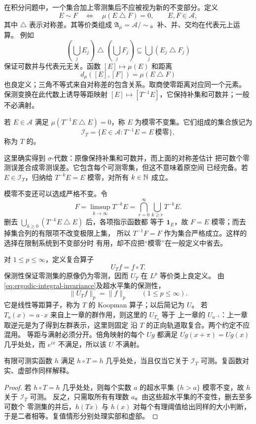 在积分问题中，一个集合加上零测集后不应被视为新的不变部分。定义
\[
 E\sim F\quad\Longleftrightarrow\quad\mu(E\mathbin\triangle F)=0,
 \qquad E,F\in\mathcal A,
\]
其中 $\triangle$ 表示对称差。其等价类组成
$\mathfrak A_\mu=\mathcal A/{\sim}$。补、并、交均在代表元上运算。
例如
\[
 \left(\bigcup_jE_j\right)\mathbin\triangle
 \left(\bigcup_jF_j\right)
 \subseteq\bigcup_j(E_j\mathbin\triangle F_j)
\]
保证可数并与代表元无关。函数 $[E]\mapsto\mu(E)$ 和距离
\[
 d_\mu([E],[F])=\mu(E\mathbin\triangle F)
\]
也良定义；三角不等式来自对称差的包含关系。取商使零距离对应同一个元素。
保测变换在此代数上诱导等距映射
$[E]\mapsto[T^{-1}E]$，它保持补集和可数并；一般不必满射。

\begin{definition}\label{def:ergodic-invariant-sigma-algebra}
若 $E\in\mathcal A$ 满足 $\mu(T^{-1}E\mathbin\triangle E)=0$，称 $E$
为模零不变集。它们组成的集合族记为
\[
 \mathcal I_T=\{E\in\mathcal A:T^{-1}E=E\ \text{模零}\},
\]
称为 $T$ 的。
\end{definition}

这里确实得到 $\sigma$-代数：原像保持补集和可数并，而上面的对称差估计
把可数个零测误差合成零测误差。它包含每个可测零集，但这不意味着原空间
已经完备。若 $E\in\mathcal I_T$，归纳给
$T^{-k}E=E$ 模零，对所有 $k\in\mathbb{N}$ 成立。

模零不变还可以选成严格不变。令
\[
 F=\limsup_{k\to\infty}T^{-k}E
   =\bigcap_{r=0}^\infty\bigcup_{k\ge r}T^{-k}E.
\]
删去 $\bigcup_{k\ge0}(T^{-k}E\mathbin\triangle E)$ 后，各项指示函数都
等于 $\mathbf1_E$，故 $F=E$ 模零；而去掉集合列的有限项不改变极限上集，
所以 $T^{-1}F=F$ 作为集合严格成立。这样的选择在限制系统到不变部分时
有用，却不应把“模零”在一般定义中省去。

对 $1\le p\le\infty$，定义复合算子
\[
 U_Tf=f\circ T.
\]
保测性保证零测集的原像仍为零测，因而 $U_T$ 在 $L^p$ 等价类上良定义。
由\eqref{eq:ergodic-integral-invariance}及超水平集的保测性，
\begin{equation}\label{eq:ergodic-koopman-isometry}
 \|U_Tf\|_p=\|f\|_p\qquad(1\le p\le\infty).
\end{equation}
它是线性等距算子，称为 $T$ 的 Koopman 算子；以后简记为 $U$。
若 $T_a(x)=a\cdot x$ 来自上一章的群作用，则这里的 $U_{T_a}$ 等于
上一章的 $U_{a^{-1}}$：上一章取逆元是为了得到左群表示，这里则固定
沿 $T$ 的正向轨道取复合。两个约定不应混用。
等距与满射必须分开。倍角映射的每个 $Ug$ 都满足
$Ug(x+\pi)=Ug(x)$ 几乎处处，而 $e^{ix}$ 不满足，所以该 $U$ 不满射。

\begin{proposition}\label{prop:ergodic-invariant-functions}
有限可测实函数 $h$ 满足 $h\circ T=h$ 几乎处处，当且仅当它关于
$\mathcal I_T$ 可测。复函数对实、虚部作同样解释。
\end{proposition}
\begin{proof}
若 $h\circ T=h$ 几乎处处，则每个实数 $a$ 的超水平集
$\{h>a\}$ 模零不变，故 $h$ 关于 $\mathcal I_T$ 可测。
反之，只需取所有有理数 $a$。由这些超水平集的不变性，删去至多可数个
零测集的并后，$h(Tx)$ 与 $h(x)$ 对每个有理阈值给出同样的大小判断，
于是二者相等。复值情形分别处理实部和虚部。
\end{proof}

